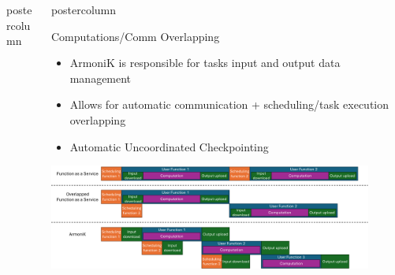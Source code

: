 \begin{frame}[fragile]
\begin{columns}[T]
\begin{column}{.49\textwidth}
\begin{beamercolorbox}[center,wd=\textwidth]{postercolumn}
\begin{minipage}[T]{.96\textwidth}
        \end{minipage}
      \end{beamercolorbox}
    \end{column}
    \begin{column}{.49\textwidth}
      \begin{beamercolorbox}[center,wd=\textwidth]{postercolumn}
        \begin{minipage}[T]{.96\textwidth}
            
            \begin{block}{Computations/Comm Overlapping}
                \begin{itemize}
                \item ArmoniK is responsible for tasks input and output data management
                \item Allows for automatic communication + scheduling/task execution overlapping
                \item Automatic Uncoordinated Checkpointing
                \end{itemize}
                \vspace{3ex}
                \centering
                \includegraphics[width=0.9\textwidth]{pipelining_compare.png}
            \end{block}


\end{minipage}
\end{beamercolorbox}
\end{column}
\end{columns}
\end{frame}
